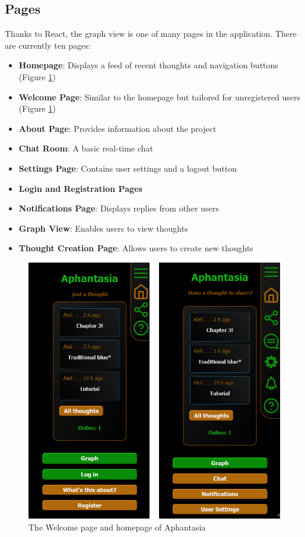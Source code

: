 \subsection{Pages}
Thanks to React, the graph view is one of many pages in the application. There are currently ten pages:
\begin{itemize}
\item \textbf{Homepage}: Displays a feed of recent thoughts and navigation buttons (Figure \ref{obr:afantazie_welcome_and_homepage})
\item \textbf{Welcome Page}: Similar to the homepage but tailored for unregistered users (Figure \ref{obr:afantazie_welcome_and_homepage})
\item \textbf{About Page}: Provides information about the project
\item \textbf{Chat Room}: A basic real-time chat
\item \textbf{Settings Page}: Contains user settings and a logout button
\item \textbf{Login and Registration Pages}
\item \textbf{Notifications Page}: Displays replies from other users
\item \textbf{Graph View}: Enables users to view thoughts
\item \textbf{Thought Creation Page}: Allows users to create new thoughts
\end{itemize}

\begin{figure}[p]
\includegraphics[width=130mm, keepaspectratio]{img/afantazie_welcome_and_home_page.png}
\caption{The Welcome page and homepage of Aphantasia}
\label{obr:afantazie_welcome_and_homepage}
\end{figure}

